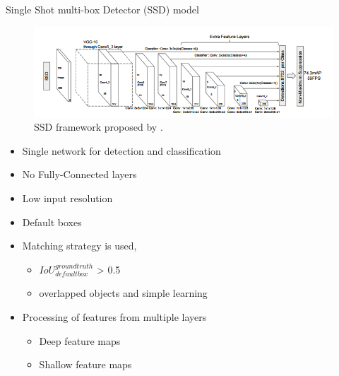 \documentclass[10pt, aspectratio=169]{beamer}
\begin{document}
\begin{frame}[allowframebreaks]{Single Shot multi-box Detector (SSD) model}
    \begin{figure}[!ht]
        \centering
        \includegraphics[scale=0.45]{images/SSD.png}
        \caption[SSD framework]{SSD framework proposed by \citep[p. 24]{Liu2016SSDSS}.}
        \label{fig:Fr-RCNN}
    \end{figure}
    \smallskip
    \begin{multicols}{2}
        \begin{itemize}
            \item Single network for detection and classification
            \item No Fully-Connected layers
            \item Low input resolution
        \end{itemize}
    \end{multicols}

    \begin{multicols}{2} %
        \begin{itemize}
            \item Default boxes
            \item Matching strategy is used,
                \begin{itemize}
                    \item $ IoU_{default box}^{ground truth}$ > 0.5
                    \item overlapped objects and simple learning 
                \end{itemize}
                
            \item Processing of features from multiple layers
                \begin{itemize}
                    \item Deep feature maps
                    \item Shallow feature maps
                \end{itemize}
        \end{itemize}


\end{multicols}
\end{frame}
\end{document}
